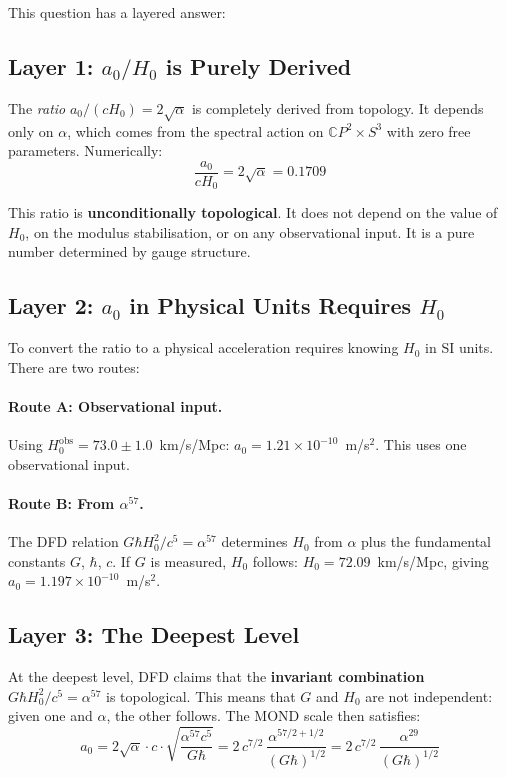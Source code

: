 \documentclass[12pt,a4paper]{article}
\newcommand{\CP}{\mathbb{C}P}
\newcommand{\Hzero}{H_0}
\newcommand{\ee}[1]{\times 10^{#1}}
\begin{document}
This question has a layered answer:

\subsection{Layer 1: $a_0/\Hzero$ is Purely Derived}

The \emph{ratio} $a_0/(c\Hzero) = 2\sqrt{\alpha}$ is completely derived from
topology. It depends only on $\alpha$, which comes from the spectral action
on $\CP^2 \times S^3$ with zero free parameters. Numerically:
\begin{equation}
\frac{a_0}{c\Hzero} = 2\sqrt{\alpha} = 0.1709
\end{equation}

This ratio is \textbf{unconditionally topological}. It does not depend on the
value of $\Hzero$, on the modulus stabilisation, or on any observational
input. It is a pure number determined by gauge structure.

\subsection{Layer 2: $a_0$ in Physical Units Requires $\Hzero$}

To convert the ratio to a physical acceleration requires knowing $\Hzero$
in SI units. There are two routes:

\paragraph{Route A: Observational input.}
Using $\Hzero^{\mathrm{obs}} = 73.0 \pm 1.0$~km/s/Mpc:
$a_0 = 1.21 \ee{-10}$~m/s$^2$. This uses one observational input.

\paragraph{Route B: From $\alpha^{57}$.}
The DFD relation $G\hbar\Hzero^2/c^5 = \alpha^{57}$ determines $\Hzero$
from $\alpha$ plus the fundamental constants $G$, $\hbar$, $c$.
If $G$ is measured, $\Hzero$ follows:
$\Hzero = 72.09$~km/s/Mpc, giving $a_0 = 1.197 \ee{-10}$~m/s$^2$.

\subsection{Layer 3: The Deepest Level}

At the deepest level, DFD claims that the \textbf{invariant combination}
$G\hbar\Hzero^2/c^5 = \alpha^{57}$ is topological. This means that
$G$ and $\Hzero$ are not independent: given one and $\alpha$, the other
follows. The MOND scale then satisfies:
\begin{equation}
a_0 = 2\sqrt{\alpha} \cdot c \cdot \sqrt{\frac{\alpha^{57} c^5}{G\hbar}}
= 2\,c^{7/2}\,\frac{\alpha^{57/2 + 1/2}}{(G\hbar)^{1/2}}
= 2\,c^{7/2}\,\frac{\alpha^{29}}{(G\hbar)^{1/2}}
\end{equation}
\end{document}
